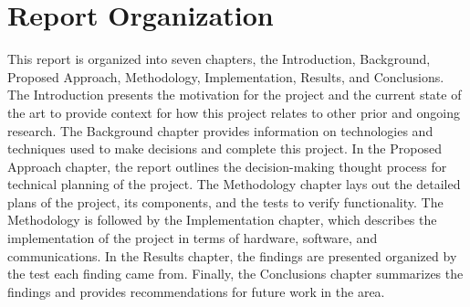 \section{Report Organization}
This report is organized into seven chapters, the Introduction, Background, Proposed Approach, Methodology, Implementation, Results, and Conclusions. The Introduction presents the motivation for the project and the current state of the art to provide context for how this project relates to other prior and ongoing research. The Background chapter provides information on technologies and techniques used to make decisions and complete this project. In the Proposed Approach chapter, the report outlines the decision-making thought process for technical planning of the project. The Methodology chapter lays out the detailed plans of the project, its components, and the tests to verify functionality. The Methodology is followed by the Implementation chapter, which describes the implementation of the project in terms of hardware, software, and communications. In the Results chapter, the findings are presented organized by the test each finding came from. Finally, the Conclusions chapter summarizes the findings and provides recommendations for future work in the area.\par